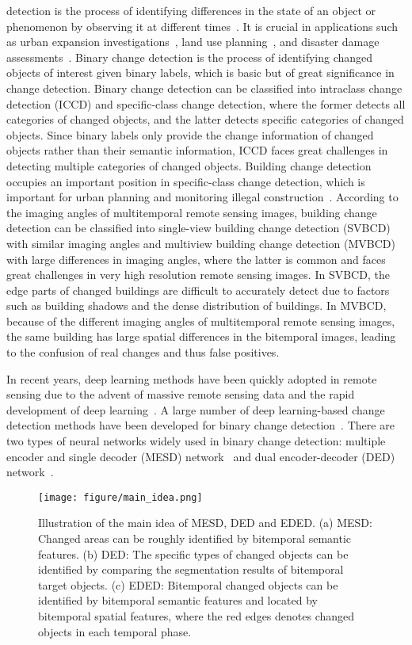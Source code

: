 \documentclass[journal]{IEEEtran}
\begin{document}
 detection is the process of identifying differences in the state of an object or phenomenon by observing it at different times~\cite{change_detection_definition}. It is crucial in applications such as urban expansion investigations~\cite{urban_expansion}, land use planning~\cite{lulc}, and disaster damage assessments~\cite{disaster_damage}. Binary change detection is the process of identifying changed objects of interest given binary labels, which is basic but of great significance in change detection. Binary change detection can be classified into intraclass change detection (ICCD) and specific-class change detection, where the former detects all categories of changed objects, and the latter detects specific categories of changed objects. Since binary labels only provide the change information of changed objects rather than their semantic information, ICCD faces great challenges in detecting multiple categories of changed objects. Building change detection occupies an important position in specific-class change detection, which is important for urban planning and monitoring illegal construction~\cite{edge}. According to the imaging angles of multitemporal remote sensing images, building change detection can be classified into single-view building change detection (SVBCD) with similar imaging angles and multiview building change detection (MVBCD) with large differences in imaging angles, where the latter is common and faces great challenges in very high resolution remote sensing images. In SVBCD, the edge parts of changed buildings are difficult to accurately detect due to factors such as building shadows and the dense distribution of buildings. In MVBCD, because of the different imaging angles of multitemporal remote sensing images, the same building has large spatial differences in the bitemporal images, leading to the confusion of real changes and thus false positives.

In recent years, deep learning methods have been quickly adopted in remote sensing due to the advent of massive remote sensing data and the rapid development of deep learning~\cite{ai_emergence_1,ai_emergency_2}. A large number of deep learning-based change detection methods have been developed for binary change detection~\cite{dsifn,hsal,change_mask,fccdn}. There are two types of neural networks widely used in binary change detection: multiple encoder and single decoder (MESD) network~\cite{fcef,dsifn} and dual encoder-decoder (DED) network~\cite{fccdn,rasr}. 

\begin{figure*}[!ht]
	\centering
		\texttt{[image: figure/main\_idea.png]}
	\caption{Illustration of the main idea of MESD, DED and EDED. (a) MESD: Changed areas can be roughly identified by bitemporal semantic features. (b) DED: The specific types of changed objects can be identified by comparing the segmentation results of bitemporal target objects. (c) EDED: Bitemporal changed objects can be identified by bitemporal semantic features and located by bitemporal spatial features, where the red edges denotes changed objects in each temporal phase.}
 \label{Fig:idea}
\end{figure*}
\end{document}
